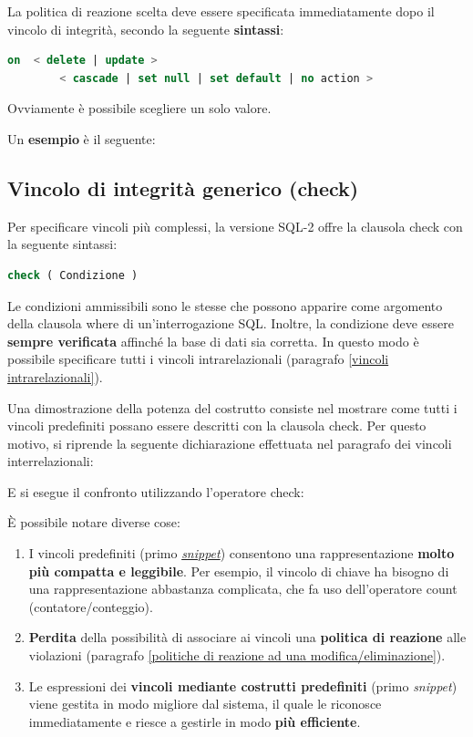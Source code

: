 \documentclass[a4paper]{article}
\begin{document}
	\noindent
	La politica di reazione scelta deve essere specificata immediatamente dopo il vincolo di integrità, secondo la seguente \textbf{sintassi}:
\begin{lstlisting}[language=SQL]
on 	< delete | update >
		< cascade | set null | set default | no action >\end{lstlisting}
	Ovviamente è possibile scegliere un solo valore.\newline
	
	\noindent
	Un \textcolor{Green4}{\textbf{esempio}} è il seguente:
	\newpage

	\subsection{Vincolo di integrità generico (\textsf{check})}

	Per specificare vincoli più complessi, la versione SQL-2 offre la clausola \textsf{check} con la seguente sintassi:
\begin{lstlisting}[language=SQL]
check ( Condizione )
\end{lstlisting}
	Le condizioni ammissibili sono le stesse che possono apparire come argomento della clausola \textsf{where} di un'interrogazione SQL. Inoltre, la condizione deve essere \textbf{sempre verificata} affinché la base di dati sia corretta. In questo modo è possibile specificare tutti i vincoli intrarelazionali (paragrafo \ref{vincoli intrarelazionali}).\newline
	
	\noindent
	Una dimostrazione della potenza del costrutto consiste nel mostrare come tutti i vincoli predefiniti possano essere descritti con la clausola \textsf{check}. Per questo motivo, si riprende la seguente dichiarazione effettuata nel paragrafo dei vincoli interrelazionali:
	
	E si esegue il confronto utilizzando l'operatore \textsf{check}:
	
	È possibile notare diverse cose:
	\begin{enumerate}
		\item I vincoli predefiniti (primo \href{https://it.wikipedia.org/wiki/Snippet}{\emph{snippet}}) consentono una rappresentazione \textbf{molto più compatta e leggibile}. Per esempio, il vincolo di chiave ha bisogno di una rappresentazione abbastanza complicata, che fa uso dell'operatore \textsf{count} (contatore/conteggio).
		
		\item \textbf{Perdita} della possibilità di associare ai vincoli una \textbf{politica di reazione} alle violazioni (paragrafo \ref{politiche di reazione ad una modifica/eliminazione}).
		
		\item Le espressioni dei \textbf{vincoli mediante costrutti predefiniti} (primo \emph{snippet}) viene gestita in modo migliore dal sistema, il quale le riconosce immediatamente e riesce a gestirle in modo \textbf{più efficiente}.
	\end{enumerate}\newpage
\end{document}
